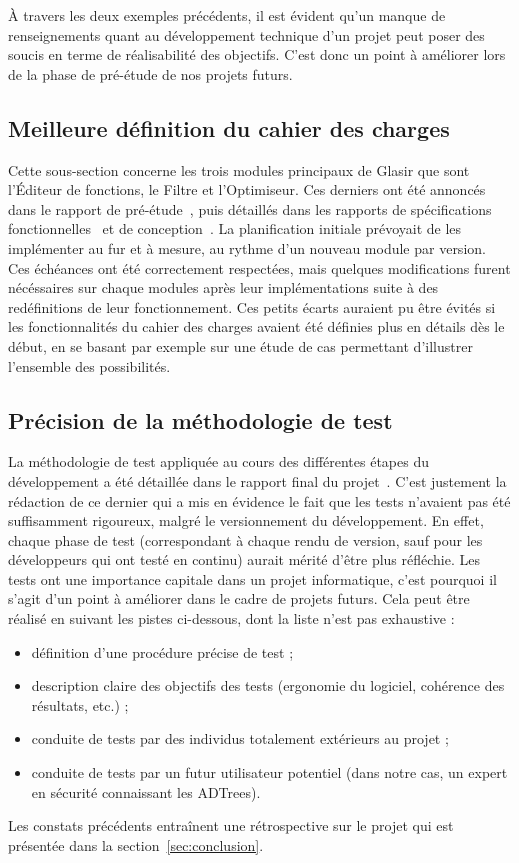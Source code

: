 À travers les deux exemples précédents, il est évident qu'un manque de renseignements quant au développement technique d'un projet peut poser des soucis en terme de réalisabilité des objectifs. C'est donc un point à améliorer lors de la phase de pré-étude de nos projets futurs.

\subsection{Meilleure définition du cahier des charges}
\label{ssec:cahier-charges}

Cette sous-section concerne les trois modules principaux de Glasir que sont l'Éditeur de fonctions, le Filtre et l'Optimiseur. Ces derniers ont été annoncés dans le rapport de pré-étude~\cite{pre_etude}, puis détaillés dans les rapports de spécifications fonctionnelles~\cite{spec_fonc} et de conception~\cite{conception}. La planification initiale prévoyait de les implémenter au fur et à mesure, au rythme d'un nouveau module par version. Ces échéances ont été correctement respectées, mais quelques modifications furent nécéssaires sur chaque modules après leur implémentations suite à des redéfinitions de leur fonctionnement. Ces petits écarts auraient pu être évités si les fonctionnalités du cahier des charges avaient été définies plus en détails dès le début, en se basant par exemple sur une étude de cas permettant d'illustrer l'ensemble des possibilités.

\subsection{Précision de la méthodologie de test}
\label{ssec:methodoTest}

La méthodologie de test appliquée au cours des différentes étapes du développement a été détaillée dans le rapport final du projet~\cite{rapportFinal}. C'est justement la rédaction de ce dernier qui a mis en évidence le fait que les tests n'avaient pas été suffisamment rigoureux, malgré le versionnement du développement. En effet, chaque phase de test (correspondant à chaque rendu de version, sauf pour les développeurs qui ont testé en continu) aurait mérité d'être plus réfléchie. Les tests ont une importance capitale dans un projet informatique, c'est pourquoi il s'agit d'un point à améliorer dans le cadre de projets futurs. Cela peut être réalisé en suivant les pistes ci-dessous, dont la liste n'est pas exhaustive : 

\begin{itemize}
\item définition d'une procédure précise de test ;
\item description claire des objectifs des tests (ergonomie du logiciel, cohérence des résultats, etc.) ;
\item conduite de tests par des individus totalement extérieurs au projet ;
\item conduite de tests par un futur utilisateur potentiel (dans notre cas, un expert en sécurité connaissant les ADTrees).
\end{itemize}

Les constats précédents entraînent une rétrospective sur le projet qui est présentée dans la {\sc section}~\ref{sec:conclusion}.